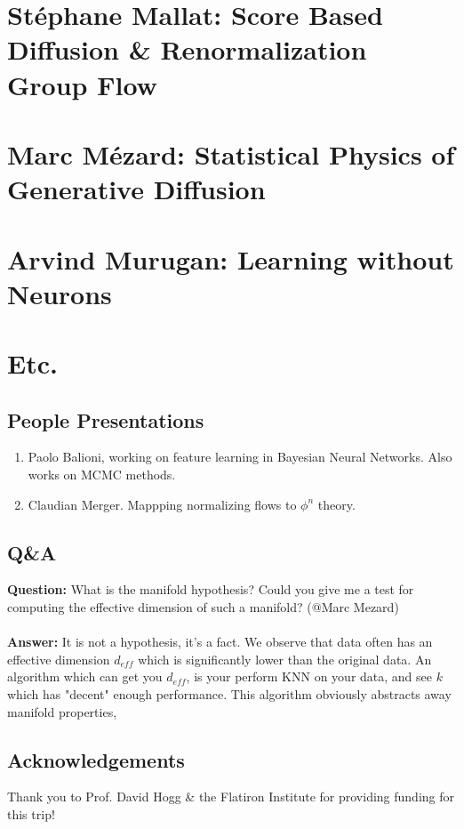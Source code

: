 \documentclass[12pt,fleqn]{book}
\numberwithin{equation}{section} %
\begin{document}
\chapter{St\'ephane Mallat: Score Based Diffusion \& Renormalization Group Flow}

\newpage

\chapter{Marc M\'ezard: Statistical Physics of Generative Diffusion}

\newpage

\chapter{Arvind Murugan: Learning without Neurons}

\newpage

\chapter{Etc.}

\section{People Presentations} 
\begin{enumerate}
	\item Paolo Balioni, working on feature learning in Bayesian Neural Networks. Also works on MCMC methods.
	\item Claudian Merger. Mappping normalizing flows to $\phi^n$ theory.
\end{enumerate}

\section{Q\&A}
\textbf{Question:} What is the manifold hypothesis? Could you give me a test for computing the effective dimension of such a manifold? (@Marc Mezard)
\\
\\
\textbf{Answer:} It is not a hypothesis, it's a fact. We observe that data often has an effective dimension $d_{eff}$ which is significantly lower than the original data. An algorithm which can get you $d_{eff}$, is your perform KNN on your data, and see $k$ which has "decent" enough performance. This algorithm obviously abstracts away manifold properties,

 
\section{Acknowledgements}
Thank you to Prof. David Hogg \& the Flatiron Institute for providing funding for this trip!
\end{document}
